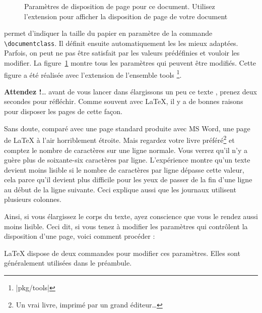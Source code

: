 \begin{figure}[!hp]
\begin{center}
\makeatletter\@mylayout\makeatother
\end{center}
\vspace*{1.8cm}
\caption[Paramètres de disposition de page pour ce document]{Paramètres de disposition de page pour ce document. Utilisez l'extension  pour afficher la disposition de page de votre document}
\label{fig:layout}
\end{figure}
\LaTeXe{} permet d'indiquer la taille du papier en paramètre de  la commande
\verb|\documentclass|. Il définit ensuite automatiquement les
 les mieux adaptées. Parfois, on peut ne pas être satisfait par les
valeurs prédéfinies et vouloir les modifier.
\thispagestyle{fancyplain}
La figure~\ref{fig:layout} montre tous les paramètres qui peuvent être
modifiés. Cette figure a été réalisée avec l'extension  de
l'ensemble tools
\footnote{\CTANref|pkg/tools|}.

\textbf{Attendez !}\dots{} avant de vous lancer dans \og élargissons un peu
ce texte \fg{}, prenez deux secondes pour réfléchir. Comme souvent avec
\LaTeX{}, il y a de bonnes raisons pour disposer les pages de cette
façon. 

Sans doute, comparé avec une page standard produite avec MS Word, une page de
\LaTeX{} à l'air horriblement étroite. Mais regardez votre livre
préféré\footnote{Un vrai livre, imprimé par un grand éditeur\dots} et
comptez le nombre de caractères sur une ligne normale. Vous verrez
qu'il n'y a guère plus de soixante-six caractères par
ligne. L'expérience montre qu'un texte devient moins lisible si le
nombre de caractères par ligne dépasse cette valeur, cela parce qu'il
devient plus difficile pour les yeux de passer de la fin d'une ligne
au début de la ligne suivante. Ceci explique aussi que les journaux
utilisent plusieurs colonnes.

Ainsi, si vous élargissez le corps du texte, ayez conscience que vous
le rendez aussi moins lisible. Ceci dit, si vous tenez à modifier les
paramètres qui contrôlent la 
disposition d'une page, voici comment procéder :

\LaTeX{} dispose de deux commandes pour modifier ces paramètres. Elles
sont généralement utilisées dans le préambule.

